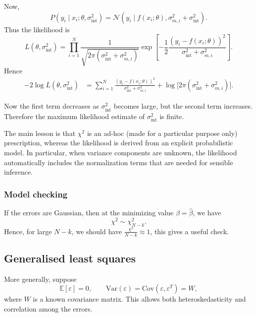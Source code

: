 \documentclass[11pt, titlepage]{article} %
\numberwithin{equation}{section}
\theoremstyle{definition}
\numberwithin{assumption}{section}
\begin{document}
Now,
\begin{equation*}
    P(y_i\mid x_i;\theta,\sigma_{\mathrm{int}}^2)
    =
    \mathcal{N}\!\left(
    y_i \mid f(x_i;\theta),\sigma_{m,i}^2+\sigma_{\mathrm{int}}^2
    \right).
\end{equation*}
Thus the likelihood is
\begin{equation*}
    L(\theta,\sigma_{\mathrm{int}}^2)
    =
    \prod_{i=1}^N
    \frac{1}{\sqrt{2\pi(\sigma_{\mathrm{int}}^2+\sigma_{m,i}^2)}}
    \exp\!\left[
    -\frac12
    \frac{(y_i-f(x_i;\theta))^2}{\sigma_{\mathrm{int}}^2+\sigma_{m,i}^2}
    \right].
\end{equation*}
Hence
\begin{align*}
    -2\log L(\theta,\sigma_{\mathrm{int}}^2)
    &=
    \sum_{i=1}^N
    \frac{(y_i-f(x_i;\theta))^2}{\sigma_{\mathrm{int}}^2+\sigma_{m,i}^2}
    +
    \log\!\bigl[2\pi(\sigma_{\mathrm{int}}^2+\sigma_{m,i}^2)\bigr].
\end{align*}

Now the first term decreases as $\sigma_{\mathrm{int}}^2$ becomes large, but the second term increases. Therefore the maximum likelihood estimate of $\sigma_{\mathrm{int}}^2$ is finite.

The main lesson is that $\chi^2$ is an ad-hoc (made for a particular purpose only) prescription, whereas the likelihood is derived from an explicit probabilistic model. In particular, when variance components are unknown, the likelihood automatically includes the normalization terms that are needed for sensible inference.

\subsubsection*{Model checking}

If the errors are Gaussian, then at the minimizing value $\beta=\hat\beta$, we have
\begin{equation*}
    \chi^2 \sim \chi^2_{N-k}.
\end{equation*}
Hence, for large $N-k$, we should have $\frac{\chi^2}{N-k}\approx 1$, this gives a useful check. 



\subsection{Generalised least squares}
More generally, suppose
\begin{equation*}
    \mathbb{E}[\varepsilon]=0,
    \qquad
    \mathrm{Var}(\varepsilon)=\mathrm{Cov}(\varepsilon,\varepsilon^T)=W,
\end{equation*}
where $W$ is a known covariance matrix. This allows both heteroskedasticity and correlation among the errors.
\end{document}
